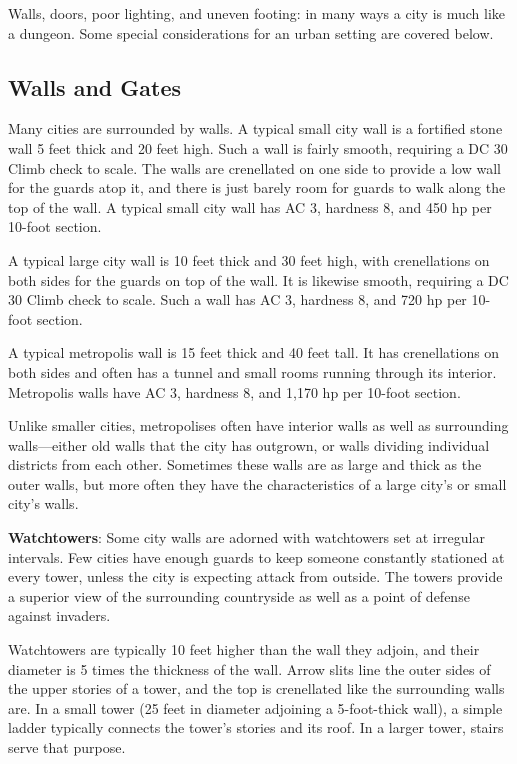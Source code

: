 				
Walls, doors, poor lighting, and uneven footing: in many ways a city is much like a dungeon. Some special considerations for an urban setting are covered below.
				
\subsection{Walls and Gates}

				
Many cities are surrounded by walls. A typical small city wall is a fortified stone wall 5 feet thick and 20 feet high. Such a wall is fairly smooth, requiring a DC 30 Climb check to scale. The walls are crenellated on one side to provide a low wall for the guards atop it, and there is just barely room for guards to walk along the top of the wall. A typical small city wall has AC 3, hardness 8, and 450 hp per 10-foot section.
				
A typical large city wall is 10 feet thick and 30 feet high, with crenellations on both sides for the guards on top of the wall. It is likewise smooth, requiring a DC 30 Climb check to scale. Such a wall has AC 3, hardness 8, and 720 hp per 10-foot section.
				
A typical metropolis wall is 15 feet thick and 40 feet tall. It has crenellations on both sides and often has a tunnel and small rooms running through its interior. Metropolis walls have AC 3, hardness 8, and 1,170 hp per 10-foot section.
				
Unlike smaller cities, metropolises often have interior walls as well as surrounding walls---either old walls that the city has outgrown, or walls dividing individual districts from each other. Sometimes these walls are as large and thick as the outer walls, but more often they have the characteristics of a large city's or small city's walls.
				
\textbf{Watchtowers}: Some city walls are adorned with watchtowers set at irregular intervals. Few cities have enough guards to keep someone constantly stationed at every tower, unless the city is expecting attack from outside. The towers provide a superior view of the surrounding countryside as well as a point of defense against invaders.
				
Watchtowers are typically 10 feet higher than the wall they adjoin, and their diameter is 5 times the thickness of the wall. Arrow slits line the outer sides of the upper stories of a tower, and the top is crenellated like the surrounding walls are. In a small tower (25 feet in diameter adjoining a 5-foot-thick wall), a simple ladder typically connects the tower's stories and its roof. In a larger tower, stairs serve that purpose. 
				
